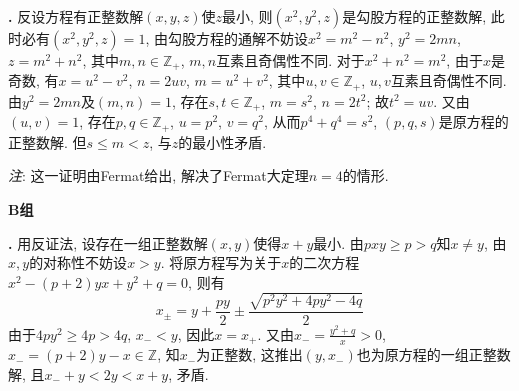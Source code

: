 \par \textbf{\thesoldio .} 反设方程有正整数解$(x,y,z)$使$z$最小, 则$(x^2,y^2,z)$是勾股方程的正整数解, 此时必有$(x^2,y^2,z)=1$, 由勾股方程的通解不妨设$x^2=m^2-n^2$, $y^2=2mn$, $z=m^2+n^2$, 其中$m,n\in \mathbb{Z}_+$, $m,n$互素且奇偶性不同. 对于$x^2+n^2=m^2$, 由于$x$是奇数, 有$x=u^2-v^2$, $n=2uv$, $m=u^2+v^2$, 其中$u,v\in \mathbb{Z}_+$, $u,v$互素且奇偶性不同. 由$y^2=2mn$及$(m,n)=1$, 存在$s,t\in \mathbb{Z}_+$, $m=s^2$, $n=2t^2$; 故$t^2=uv$. 又由$(u,v)=1$, 存在$p,q\in \mathbb{Z}_+$, $u=p^2$, $v=q^2$, 从而$p^4+q^4=s^2$, $(p,q,s)$是原方程的正整数解. 但$s\le m<z$, 与$z$的最小性矛盾. 
\par \emph{注}: 这一证明由Fermat给出, 解决了Fermat大定理$n=4$的情形.

\par \textbf{B组}
\par \textbf{\thesoldio .} \cite{SMI} 用反证法, 设存在一组正整数解$(x,y)$使得$x+y$最小. 由$pxy\ge p>q$知$x\neq y$, 由$x,y$的对称性不妨设$x>y$. 将原方程写为关于$x$的二次方程$x^2-(p+2)yx+y^2+q=0$, 则有
\begin{equation}
    x_\pm = y+\frac{py}{2} \pm \frac{ \sqrt{p^2y^2+4py^2-4q}}{2}
\end{equation}
由于$4py^2\ge 4p>4q$, $x_-<y$, 因此$x=x_+$. 又由$x_-=\frac{y^2+q}{x}>0$, $x_-=(p+2)y-x\in \mathbb{Z}$, 知$x_-$为正整数, 这推出$(y,x_-)$也为原方程的一组正整数解, 且$x_-+y<2y<x+y$, 矛盾. 